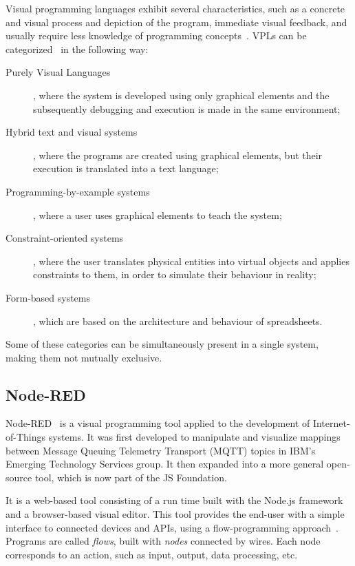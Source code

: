 Visual programming languages exhibit several characteristics, such as a concrete and visual process and depiction of the program, immediate visual feedback, and usually require less knowledge of programming concepts~\cite{scaling_vpls}. VPLs can be categorized~\cite{vpls_survey} in the following way: 
\begin{description}
    \item[Purely Visual Languages], where the system is developed using only graphical elements and the subsequently debugging and execution is made in the same environment;
    \item[Hybrid text and visual systems], where the programs are created using graphical elements, but their execution is translated into a text language;
    \item[Programming-by-example systems], where a user uses graphical elements to teach the system;
    \item[Constraint-oriented systems], where the user translates physical entities into virtual objects and applies constraints to them, in order to simulate their behaviour in reality;
    \item[Form-based systems], which are based on the architecture and behaviour of spreadsheets.
\end{description}

Some of these categories can be simultaneously present in a single system, making them not mutually exclusive.

\subsection{Node-RED}\label{sec:node-red}

Node-RED~\cite{node_red} is a visual programming tool applied to the development of Internet-of-Things systems. It was first developed to manipulate and visualize mappings between Message Queuing Telemetry Transport (MQTT) topics in IBM's Emerging Technology Services group. It then expanded into a more general open-source tool, which is now part of the JS Foundation.

It is a web-based tool consisting of a run time built with the Node.js framework and a browser-based visual editor. This tool provides the end-user with a simple interface to connected devices and APIs, using a flow-programming approach~\cite{node_red}. Programs are called \emph{flows}, built with \emph{nodes} connected by wires. Each node corresponds to an action, such as input, output, data processing, etc.

